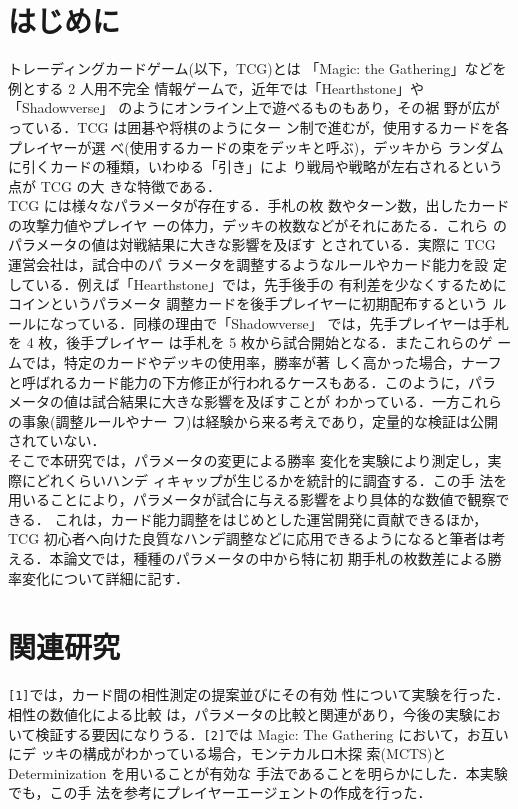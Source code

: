 \documentclass[twocolumn]{ltjsarticle}
\begin{document}
\section{はじめに}
\small{
  トレーディングカードゲーム(以下，TCG)とは
「Magic: the Gathering」などを例とする 2 人用不完全
情報ゲームで，近年では「Hearthstone」や「Shadowverse」
のようにオンライン上で遊べるものもあり，その裾
野が広がっている．TCG は囲碁や将棋のようにター
ン制で進むが，使用するカードを各プレイヤーが選
べ(使用するカードの束をデッキと呼ぶ)，デッキから
ランダムに引くカードの種類，いわゆる「引き」によ
り戦局や戦略が左右されるという点が TCG の大
きな特徴である．
\\  TCG には様々なパラメータが存在する．手札の枚
数やターン数，出したカードの攻撃力値やプレイヤ
ーの体力，デッキの枚数などがそれにあたる．これら
のパラメータの値は対戦結果に大きな影響を及ぼす
とされている．実際に TCG 運営会社は，試合中のパ
ラメータを調整するようなルールやカード能力を設
定している．例えば「Hearthstone」では，先手後手の
有利差を少なくするためにコインというパラメータ
調整カードを後手プレイヤーに初期配布するという
ルールになっている．同様の理由で「Shadowverse」
では，先手プレイヤーは手札を 4 枚，後手プレイヤー
は手札を 5 枚から試合開始となる．またこれらのゲ
ームでは，特定のカードやデッキの使用率，勝率が著
しく高かった場合，ナーフと呼ばれるカード能力の下方修正が行われるケースもある．このように，パラ
メータの値は試合結果に大きな影響を及ぼすことが
わかっている．一方これらの事象(調整ルールやナー
フ)は経験から来る考えであり，定量的な検証は公開
されていない．
\\  そこで本研究では，パラメータの変更による勝率
変化を実験により測定し，実際にどれくらいハンデ
ィキャップが生じるかを統計的に調査する．この手
法を用いることにより，パラメータが試合に与える影響をより具体的な数値で観察できる．
これは，カード能力調整をはじめとした運営開発に貢献できるほか，
TCG 初心者へ向けた良質なハンデ調整などに応用できるようになると筆者は考
える．本論文では，種種のパラメータの中から特に初
期手札の枚数差による勝率変化について詳細に記す．
}

\section{関連研究}
\small{
  \verb#[1]#では，カード間の相性測定の提案並びにその有効
性について実験を行った．相性の数値化による比較
は，パラメータの比較と関連があり，今後の実験にお
いて検証する要因になりうる．\verb#[2]#では Magic: The Gathering において，お互いにデ
ッキの構成がわかっている場合，モンテカルロ木探
索(MCTS)と Determinization を用いることが有効な
手法であることを明らかにした．本実験でも，この手
法を参考にプレイヤーエージェントの作成を行った．
}
\end{document}
